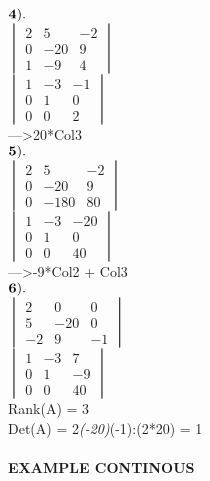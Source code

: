 \documentclass[]{article}
\let\oldparagraph\paragraph
\renewcommand{\paragraph}[1]{\oldparagraph{#1}\mbox{}}
\begin{document}
\(\bold{4).}\)\\

\(\begin{vmatrix} 2 & 5 & -2\\ 0 & -20 & 9 \\ 1 & -9 & 4 \end{vmatrix}\)\\

\(\begin{vmatrix} 1 & -3 & -1\\ 0 & 1 & 0 \\ 0 & 0 & 2 \end{vmatrix}\)\\

---\textgreater{}20*Col3\\

\(\bold{5).}\)\\

\(\begin{vmatrix} 2 & 5 & -2\\ 0 & -20 & 9 \\ 0 & -180 & 80 \end{vmatrix}\)\\

\(\begin{vmatrix} 1 & -3 & -20\\ 0 & 1 & 0 \\ 0 & 0 & 40 \end{vmatrix}\)\\

---\textgreater{}-9*Col2 + Col3\\

\(\bold{6).}\)\\

\(\begin{vmatrix} 2 & 0 & 0\\ 5 & -20 & 0\\ -2 & 9 & -1 \end{vmatrix}\)\\

\(\begin{vmatrix} 1 & -3 & 7\\ 0 & 1 & -9 \\ 0 & 0 & 40 \end{vmatrix}\)\\

Rank(A) = 3\\
 Det(A) = 2\emph{(-20)}(-1):(2*20) = 1\\

\paragraph{\texorpdfstring{EXAMPLE CONTINOUS\\
}{EXAMPLE CONTINOUS }}\label{example-continous}
\end{document}
